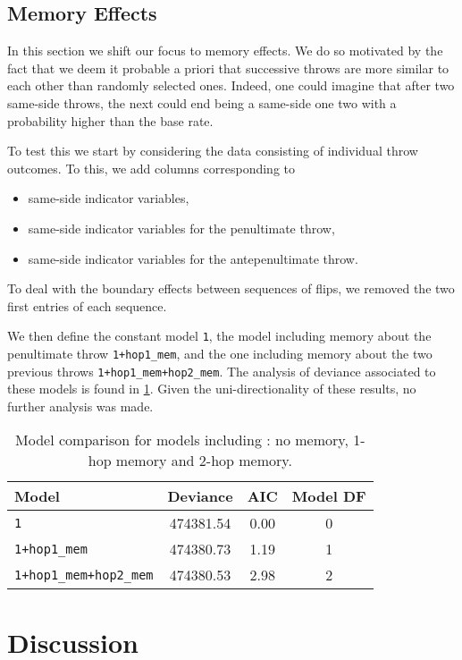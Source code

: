 \documentclass[a4paper, 12pt,oneside]{article}
\begin{document}
		\subsection{Memory Effects}
		In this section we shift our focus to memory effects. We do so motivated by the fact that we deem it probable a priori that successive throws are more similar to each other than randomly selected ones. Indeed, one could imagine that after two same-side throws, the next could end being a same-side one two with a probability higher than the base rate. 
		
		To test this we start by considering the data consisting of individual throw outcomes. To this, we add columns corresponding to 
		\begin{itemize}
			\item same-side indicator variables,
			\item same-side indicator variables for the penultimate throw,
			\item same-side indicator variables for the antepenultimate throw.
		\end{itemize}
		To deal with the boundary effects between sequences of flips, we removed the two first entries of each sequence. 
		
		We then define the constant model \texttt{1}, the model including memory about the penultimate throw \texttt{1+hop1\_mem}, and the one including memory about the two previous throws \texttt{1+hop1\_mem+hop2\_mem}. The analysis of deviance associated to these models is found in \ref{tab:memory-model-comparison}. Given the uni-directionality of these results, no further analysis was made.  
		\begin{table}[htb]
			\centering
			\caption{Model comparison for models including : no memory, 1-hop memory and 2-hop memory.}
			\label{tab:memory-model-comparison}
			\begin{tabular}{lccc}
			\toprule
			Model & Deviance & AIC & Model DF \\
			\midrule
			\texttt{1} & 474381.54 & 0.00 & 0 \\
			\texttt{1+hop1\_mem} & 474380.73 & 1.19 & 1 \\
			\texttt{1+hop1\_mem+hop2\_mem} & 474380.53 & 2.98 & 2 \\
			\bottomrule
			\end{tabular}
		\end{table}
	\section{Discussion}
\end{document}
